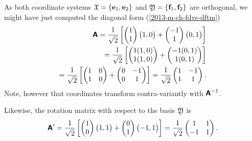 {\begin{enumerate}
As both coordinate systems ${\frak X}
=
\{
{\bf e}_1,
{\bf e}_2
\}$
and
${\frak Y}
=  \{
{\bf f}_1,
{\bf f}_2
\}$ are orthogonal, we might have just computed
the diagonal form (\ref{2013-m-ch-fdvs-dftm})
\begin{equation}
\begin{split}
 \textsf{\textbf{A}}=
\frac{1}{\sqrt{2}}
\left[
\begin{pmatrix}
1\\
1
\end{pmatrix}
\begin{pmatrix}
1,0
\end{pmatrix}
+
\begin{pmatrix}
-1\\
1
\end{pmatrix}
\begin{pmatrix}
0,1
\end{pmatrix}
\right] \\
=
\frac{1}{\sqrt{2}}
\left[
\begin{pmatrix}
1(1,0)\\
1 (1,0)
\end{pmatrix}
+
\begin{pmatrix}
-1(0,1)\\
1(0,1)
\end{pmatrix}
\right] \\
=
\frac{1}{\sqrt{2}}
\left[
\begin{pmatrix}
1&0\\
1&0
\end{pmatrix}
+
\begin{pmatrix}
0&-1\\
0&1
\end{pmatrix}
\right]
=
\frac{1}{\sqrt{2}}
\begin{pmatrix}
1&-1\\
1&1
\end{pmatrix}
.
\end{split}
\end{equation}
Note, however that coordinates transform contra-variantly with
$\textsf{\textbf{A}}^{-1}$.


Likewise, the rotation matrix with respect to the basis ${\frak Y}$  is
\begin{equation}
\begin{split}
 \textsf{\textbf{A}}'=
\frac{1}{\sqrt{2}}
\left[
\begin{pmatrix}
1\\
0
\end{pmatrix}
\begin{pmatrix}
1,1
\end{pmatrix}
+
\begin{pmatrix}
0\\
1
\end{pmatrix}
\begin{pmatrix}
-1,1
\end{pmatrix}
\right]
=
\frac{1}{\sqrt{2}}
\begin{pmatrix}
1&1\\
-1&1
\end{pmatrix}
.
\end{split}
\end{equation}




\end{enumerate}}

